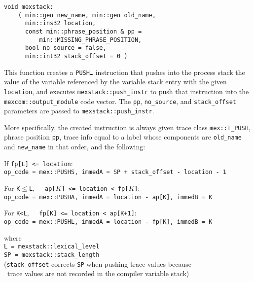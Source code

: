 \documentclass[12pt]{article}
\begin{document}
\verb|void mexstack:| 
                      \label{PUSH-PUSH-INSTR} \\
\verb|    ( min::gen new_name, min::gen old_name,| \\
\verb|      min::ins32 location,| \\
\verb|      const min::phrase_position & pp =| \\
\verb|          min::MISSING_PHRASE_POSITION,| \\
\verb|      bool no_source = false,| \\
\verb|      min::int32 stack_offset = 0 )|
\begin{indpar}
This function creates a {\tt PUSH\ldots} instruction that pushes
into the process stack
the value of the variable referenced by the variable stack entry
with the given {\tt location}, and executes {\tt mexstack::push\_instr}
to push that instruction into the {\tt mexcom::\EOL output\_\EOL module}
code vector.  The {\tt pp}, {\tt no\_source},
and {\tt stack\_offset} parameters
are passed to {\tt mexstack::\EOL push\_\EOL instr}.

More specifically, the created instruction is always given
trace class {\tt mex::T\_PUSH}, phrase position {\tt pp},
trace info equal to a label whose components are {\tt old\_name}
and {\tt new\_name} in that order, and the following:

If {\tt fp[L] <= location}: \\
\hspace*{3em}\verb|op_code = mex::PUSHS, immedA = SP + stack_offset - location - 1|

For {\tt K$\leq$L},~~~{\tt ap[$K$] <= location < fp[$K$]}: \\
\hspace*{3em}\verb|op_code = mex::PUSHA, immedA = location - ap[K], immedB = K|

For {\tt K<L},~~~{\tt fp[K] <= location < ap[K+1]}: \\
\hspace*{3em}\verb|op_code = mex::PUSHL, immedA = location - fp[K], immedB = K|

where \\
\hspace*{3em}\verb|L = mexstack::lexical_level| \\
\hspace*{3em}\verb|SP = mexstack::stack_length| \\
\hspace*{3em}({\tt stack\_offset} corrects {\tt SP} when pushing trace values
							      because \\
\hspace*{3em}~trace values are not recorded in the compiler variable stack)
\end{indpar}
\end{document}
